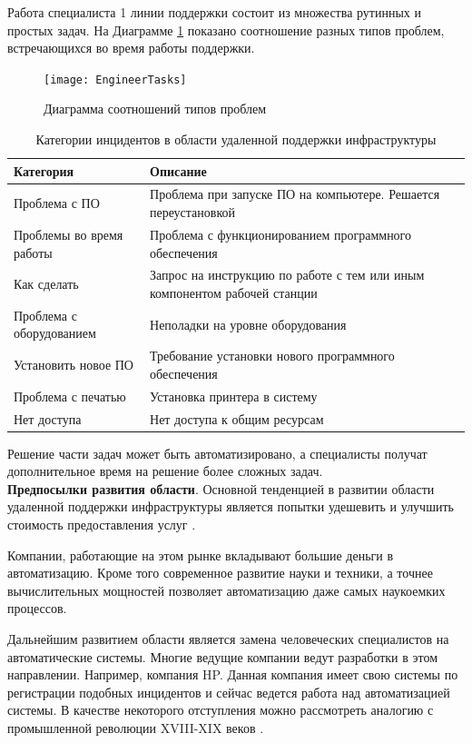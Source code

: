 Работа специалиста 1 линии поддержки состоит из множества рутинных и простых задач. На Диаграмме \ref{img:EngineerTasks}  показано соотношение разных типов проблем, встречающихся во время работы поддержки.

\begin{figure} [h] 
  \center
  \texttt{[image: EngineerTasks]}
  \caption{Диаграмма соотношений типов проблем} 
  \label{img:EngineerTasks}  
\end{figure}

\begin{table} [htbp]
  \centering
  \parbox{15cm}{\caption{Категории инцидентов в области удаленной поддержки инфраструктуры}\label{IncidentDescription}}
  \begin{tabular}{| p{7cm} || p{7cm} |}
 
  \hline
Категория & Описание \\
  \hline
Проблема с ПО	& Проблема при запуске ПО на компьютере. Решается переустановкой \\
Проблемы во время работы  & Проблема с функционированием программного обеспечения\\
Как сделать & Запрос на инструкцию по работе с тем или иным компонентом рабочей станции \\
Проблема с оборудованием  & Неполадки на уровне оборудования \\
Установить новое ПО       & Требование установки нового программного обеспечения \\
Проблема с печатью        & Установка принтера в систему \\
Нет доступа               & Нет доступа к общим ресурсам \\
  \hline
  \end{tabular}
\end{table}

Решение части задач может быть автоматизировано, а специалисты получат дополнительное время на решение более сложных задач. \\

\textbf{Предпосылки развития области}. 
Основной тенденцией в развитии области удаленной поддержки инфраструктуры является попытки удешевить и улучшить стоимость предоставления услуг \cite{OutsourceEff}. \par
Компании, работающие на этом рынке вкладывают большие деньги в автоматизацию. Кроме того современное развитие науки и техники, а точнее вычислительных мощностей \cite{SuperComputer} позволяет автоматизацию даже самых наукоемких процессов. \par
Дальнейшим развитием области является замена человеческих специалистов на автоматические системы. Многие ведущие компании ведут разработки в этом направлении. Например, компания HP. Данная компания имеет свою системы по регистрации подобных инцидентов и сейчас ведется работа над автоматизацией системы. В качестве некоторого отступления можно рассмотреть аналогию с промышленной революции XVIII-XIX веков \cite{IndustrialRev}. \\

